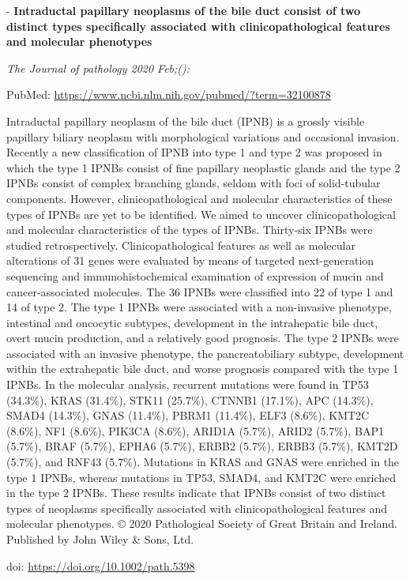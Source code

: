 \documentclass[
]{article}
\begin{document}
- \textbf{Intraductal papillary neoplasms of the bile duct consist of
two distinct types specifically associated with clinicopathological
features and molecular phenotypes}

\emph{The Journal of pathology 2020 Feb;():}

PubMed: \url{https://www.ncbi.nlm.nih.gov/pubmed/?term=32100878}

Intraductal papillary neoplasm of the bile duct (IPNB) is a grossly
visible papillary biliary neoplasm with morphological variations and
occasional invasion. Recently a new classification of IPNB into type 1
and type 2 was proposed in which the type 1 IPNBs consist of fine
papillary neoplastic glands and the type 2 IPNBs consist of complex
branching glands, seldom with foci of solid-tubular components. However,
clinicopathological and molecular characteristics of these types of
IPNBs are yet to be identified. We aimed to uncover clinicopathological
and molecular characteristics of the types of IPNBs. Thirty-six IPNBs
were studied retrospectively. Clinicopathological features as well as
molecular alterations of 31 genes were evaluated by means of targeted
next-generation sequencing and immunohistochemical examination of
expression of mucin and cancer-associated molecules. The 36 IPNBs were
classified into 22 of type 1 and 14 of type 2. The type 1 IPNBs were
associated with a non-invasive phenotype, intestinal and oncocytic
subtypes, development in the intrahepatic bile duct, overt mucin
production, and a relatively good prognosis. The type 2 IPNBs were
associated with an invasive phenotype, the pancreatobiliary subtype,
development within the extrahepatic bile duct, and worse prognosis
compared with the type 1 IPNBs. In the molecular analysis, recurrent
mutations were found in TP53 (34.3\%), KRAS (31.4\%), STK11 (25.7\%),
CTNNB1 (17.1\%), APC (14.3\%), SMAD4 (14.3\%), GNAS (11.4\%), PBRM1
(11.4\%), ELF3 (8.6\%), KMT2C (8.6\%), NF1 (8.6\%), PIK3CA (8.6\%),
ARID1A (5.7\%), ARID2 (5.7\%), BAP1 (5.7\%), BRAF (5.7\%), EPHA6
(5.7\%), ERBB2 (5.7\%), ERBB3 (5.7\%), KMT2D (5.7\%), and RNF43 (5.7\%).
Mutations in KRAS and GNAS were enriched in the type 1 IPNBs, whereas
mutations in TP53, SMAD4, and KMT2C were enriched in the type 2 IPNBs.
These results indicate that IPNBs consist of two distinct types of
neoplasms specifically associated with clinicopathological features and
molecular phenotypes. © 2020 Pathological Society of Great Britain and
Ireland. Published by John Wiley \& Sons, Ltd.

doi: \url{https://doi.org/10.1002/path.5398}
\end{document}
